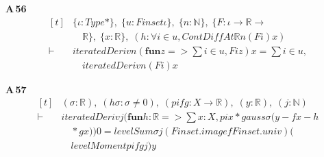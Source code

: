 \noindent\textbf{A\,56}\quad{}
{\footnotesize\[ \begin{aligned}[t]
&\{ \iota : \mathit{Type}*\},\; \{ \mathit{u} : \mathit{Finset} \iota \},\; \{ \mathit{n} : \mathbb{N} \},\; \{ \mathit{F} : \iota \to \mathbb{R} \to\\
&\quad \mathbb{R} \},\; \{ \mathit{x} : \mathbb{R} \},\; (\mathit{h} : \forall \mathit{i} \in \mathit{u}, \mathit{ContDiffAt} \mathbb{R} \mathit{n} (\mathit{F} \mathit{i}) \mathit{x})\\
\vdash\;&\mathit{iteratedDeriv} \mathit{n} (\mathbf{fun} \mathit{z} => \textstyle\sum \mathit{i} \in \mathit{u}, \mathit{F} \mathit{i} \mathit{z}) \mathit{x} = \textstyle\sum \mathit{i} \in \mathit{u},\\
&\quad \mathit{iteratedDeriv} \mathit{n} (\mathit{F} \mathit{i}) \mathit{x}
\end{aligned} \]}

\noindent\textbf{A\,57}\quad{}
{\footnotesize\[ \begin{aligned}[t]
&(\sigma : \mathbb{R} ),\; (\mathit{hσ} : \sigma \neq 0),\; (\mathit{pi} \mathit{f} \mathit{g} : \mathit{X} \to \mathbb{R} ),\; (\mathit{y} : \mathbb{R} ),\; (\mathit{j} : \mathbb{N} )\\
\vdash\;&\mathit{iteratedDeriv} \mathit{j} (\mathbf{fun} \mathit{h} : \mathbb{R} => \textstyle\sum \mathit{x} : \mathit{X}, \mathit{pi} \mathit{x} * \mathit{gauss} \sigma (\mathit{y} - \mathit{f} \mathit{x} - \mathit{h}\\
&\quad * \mathit{g} \mathit{x})) 0 = \mathit{levelSum} \sigma \mathit{j} (\mathit{Finset}.\mathit{image} \mathit{f} \mathit{Finset}.\mathit{univ}) (\\
&\quad \mathit{levelMoment} \mathit{pi} \mathit{f} \mathit{g} \mathit{j}) \mathit{y}
\end{aligned} \]}

